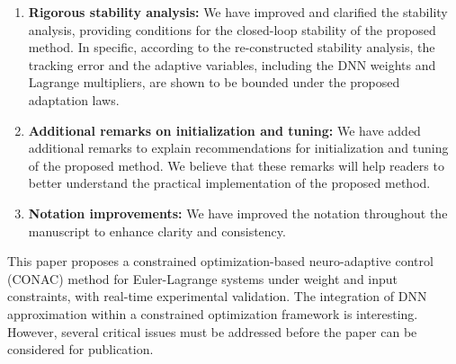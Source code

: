 \documentclass[12pt,english]{reviewresponse}
\providecommand{\DIFdelbegin}{} %
\providecommand{\DIFdelend}{} %
\providecommand{\DIFscaledelfig}{0.5}
\newlength{\DIFdelgraphicswidth} %
\newlength{\DIFdelgraphicsheight} %
\providecommand{\DIFdelincludegraphics}[2][]{%
\sbox{\DIFdelgraphicsbox}{\DIFOincludegraphics[#1]{#2}}%
\settoboxwidth{\DIFdelgraphicswidth}{\DIFdelgraphicsbox} %
\settoboxtotalheight{\DIFdelgraphicsheight}{\DIFdelgraphicsbox} %
\scalebox{\DIFscaledelfig}{%
\parbox[b]{\DIFdelgraphicswidth}{\usebox{\DIFdelgraphicsbox}\\[-\baselineskip] \rule{\DIFdelgraphicswidth}{0em}}\llap{\resizebox{\DIFdelgraphicswidth}{\DIFdelgraphicsheight}{%
\setlength{\unitlength}{\DIFdelgraphicswidth}%
\begin{picture}(1,1)%
\thicklines\linethickness{2pt} %
{\color[rgb]{1,0,0}\put(0,0){\framebox(1,1){}}}%
{\color[rgb]{1,0,0}\put(0,0){\line( 1,1){1}}}%
{\color[rgb]{1,0,0}\put(0,1){\line(1,-1){1}}}%
\end{picture}%
}\hspace*{3pt}}} %
} %
\DeclareRobustCommand{\DIFdelbegin}{\DIFOdelbegin \let\includegraphics\DIFdelincludegraphics} %
\DeclareRobustCommand{\DIFdelend}{\DIFOaddend \let\includegraphics\DIFOincludegraphics} %
\begin{document}
\begin{revresponse}[]
\begin{enumerate}
\DIFdelbegin %

\DIFdelend \item \textbf{Rigorous stability analysis:} 
      We have improved and clarified the stability analysis, providing conditions for the closed-loop stability of the proposed method.
      In specific, according to the re-constructed stability analysis, the tracking error and the adaptive variables, including the DNN weights and Lagrange multipliers, are shown to be bounded under the proposed adaptation laws.

    \item \textbf{Additional remarks on initialization and tuning:} 
      We have added additional remarks to explain recommendations for initialization and tuning of the proposed method.
      We believe that these remarks will help readers to better understand the practical implementation of the proposed method.

    \item \textbf{Notation improvements:} 
      We have improved the notation throughout the manuscript to enhance clarity and consistency.

  \end{enumerate}

\end{revresponse}

\reviewer
\begin{generalcomment}
	This paper proposes a constrained optimization-based neuro-adaptive control (CONAC) method for Euler-Lagrange systems under weight and input constraints, with real-time experimental validation. The integration of DNN approximation within a constrained optimization framework is interesting. However, several critical issues must be addressed before the paper can be considered for publication.
\end{generalcomment}
\end{document}
